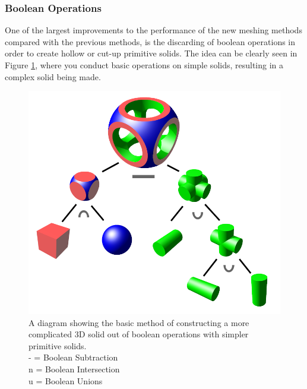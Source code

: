 \documentclass[12pt,a4paper]{article}
\begin{document}
\subsubsection{Boolean Operations}
\label{bool}
One of the largest improvements to the performance of the new meshing methods compared with the previous methods, is the discarding of boolean operations in order to create hollow or cut-up primitive solids. The idea can be clearly seen in Figure \ref{booly}, where you conduct basic operations on simple solids, resulting in a complex solid being made.
\\
\begin{figure}[h!]
\centering
\includegraphics[scale=0.3]{Images//Booleans//Boolean.png}
\caption[width=\columnwidth]{A diagram showing the basic method of constructing a more complicated 3D solid out of boolean operations with simpler primitive solids.\\
- = Boolean Subtraction\\
n = Boolean Intersection\\
u = Boolean Unions}
\label{booly}
\end{figure}
\end{document}

